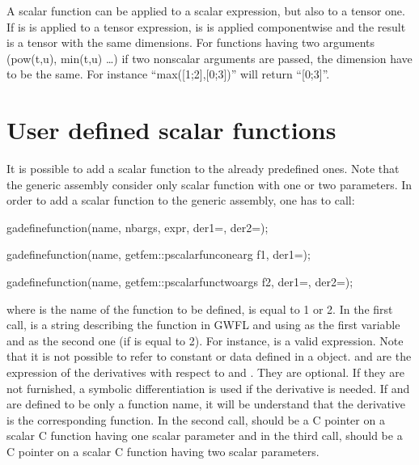 \documentclass[a4paper,11pt,english]{sphinxmanual}
\begin{document}
A scalar function can be applied to a scalar expression, but also to a tensor one. If is is applied to a tensor expression, is is applied componentwise and the result is a tensor with the same dimensions. For functions having two arguments (pow(t,u), min(t,u) …) if two non\sphinxhyphen{}scalar arguments are passed, the dimension have to be the same. For instance “max({[}1;2{]},{[}0;3{]})” will return “{[}0;3{]}”.


\section{User defined scalar functions}
\label{\detokenize{userdoc/gasm_high:user-defined-scalar-functions}}
It is possible to add a scalar function to the already predefined ones. Note that the generic assembly consider only scalar function with one or two parameters. In order to add a scalar function to the generic assembly, one has to call:

\begin{sphinxVerbatim}[commandchars=\\\{\}]
ga\PYGZus{}define\PYGZus{}function(name, nb\PYGZus{}args, expr, der1=\PYGZdq{}\PYGZdq{}, der2=\PYGZdq{}\PYGZdq{});

ga\PYGZus{}define\PYGZus{}function(name, getfem::pscalar\PYGZus{}func\PYGZus{}onearg f1, der1=\PYGZdq{}\PYGZdq{});

ga\PYGZus{}define\PYGZus{}function(name, getfem::pscalar\PYGZus{}func\PYGZus{}twoargs f2, der1=\PYGZdq{}\PYGZdq{}, der2=\PYGZdq{}\PYGZdq{});
\end{sphinxVerbatim}

where  is the name of the function to be defined,  is equal to 1 or 2. In the first call,  is a string describing the function in GWFL and using  as the first variable and  as the second one (if  is equal to 2). For instance,  is a valid expression. Note that it is not possible to refer to constant or data defined in a  object.  and  are the expression of the derivatives with respect to  and . They are optional. If they are not furnished, a symbolic differentiation is used if the derivative is needed. If  and  are defined to be only a function name, it will be understand that the derivative is the corresponding function. In the second call,  should be a C pointer on a scalar C function having one scalar parameter and in the third call,   should be a C pointer on a scalar C function having two scalar parameters.
\end{document}
